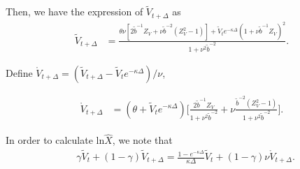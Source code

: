 \documentclass{ws-ijfe}
\begin{document}
Then, we have the expression of $\tilde{V}_{t+\Delta}$ as
\begin{equation*}
\begin{split}
\tilde{V}_{t+\Delta}%
&=\frac{\theta\nu[2\tilde{b}^{-1}Z_V+\nu\tilde{b}^{-2}(Z_V^2-1)]+\tilde{V}_te^{-\kappa\Delta}(1+\nu\tilde{b}^{-1}Z_V)^2}{1+\nu^2\tilde{b}^{-2}}.
\end{split}
\end{equation*}

Define $ \mathring{V}_{t+\Delta}=(\tilde{V}_{t+\Delta}-\tilde{V}_te^{-\kappa\Delta})\big/{\nu }$,

\begin{equation*}
\begin{split}
\mathring{V}_{t+\Delta}
&=(\theta+\tilde{V}_te^{-\kappa\Delta})\bigg[\frac{2\tilde{b}^{-1}Z_V}{1+\nu^2\tilde{b}^{-2}}+\nu\frac{\tilde{b}^{-2}(Z_V^2-1)}{1+\nu^2\tilde{b}^{-2}}\bigg].
\end{split}
\end{equation*}

In order to calculate $\text{ln}\hat{X}$, we note that
\begin{equation*}
\begin{split}
&\gamma\tilde{V}_{t}+(1-\gamma)\tilde{V}_{t+\Delta}
=%
\frac{1-e^{-\kappa\Delta}}{\kappa\Delta}\tilde{V}_t+(1-\gamma)\nu\mathring{V}_{t+\Delta}.\\
\end{split}
\end{equation*}
\end{document}

